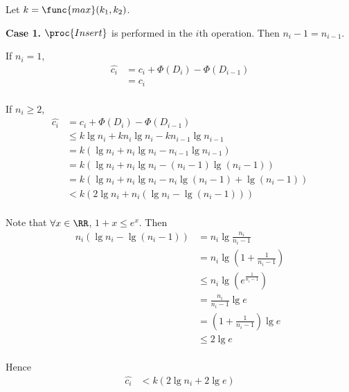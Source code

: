 Let $k = \func{max}(k_1,k_2)$.

\textbf{Case 1.}
$\proc{Insert}$ is performed in the $i$th operation.
Then $n_i - 1 = n_{i-1}$.

If $n_i = 1$,
\begin{equation*}
\begin{split}
    \hat{c_i} & = c_i + \Phi(D_i) - \Phi(D_{i - 1}) \\
    & = c_i \\
\end{split}
\end{equation*}

If $n_i \geq 2$,
\begin{equation*}
\begin{split}
    \hat{c_i} & = c_i + \Phi(D_i) - \Phi(D_{i - 1}) \\
    & \leq k \lg n_i + k n_i \lg n_i - k n_{i-1} \lg n_{i-1} \\
    & = k (\lg n_i + n_i \lg n_i - n_{i-1} \lg n_{i-1}) \\
    & = k (\lg n_i + n_i \lg n_i - (n_i - 1) \lg (n_i - 1)) \\
    & = k(\lg n_i + n_i \lg n_i - n_i \lg (n_i - 1) + \lg (n_i - 1)) \\
    & < k(2\lg n_i + n_i (\lg n_i - \lg (n_i - 1))) \\
\end{split}
\end{equation*}

Note that $\forall x \in \RR$, $1 + x \leq e^x$.
Then
\begin{equation*}
\begin{split}
    n_i (\lg n_i - \lg (n_i - 1)) & = n_i \lg \frac{n_i}{n_i - 1} \\
    & = n_i \lg (1 + \frac{1}{n_i - 1}) \\
    & \leq n_i \lg (e^{\frac{1}{n_i - 1}}) \\
    & = \frac{n_i}{n_i - 1} \lg e \\
    & = (1 + \frac{1}{n_i - 1}) \lg e \\
    & \leq 2 \lg e \\
\end{split}
\end{equation*}

Hence
\begin{equation*}
\begin{split}
    \hat{c_i} & < k(2\lg n_i + 2 \lg e)
\end{split}
\end{equation*}

